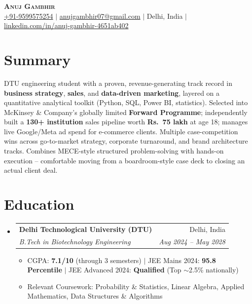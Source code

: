 \documentclass[letterpaper,10.5pt]{article}
\makeatletter
\newcommand{\resumeItem}[1]{
  \item\small{#1 \vspace{-2pt}}
}
\newcommand{\resumeSubheading}[4]{
  \vspace{-2pt}\item
    \begin{tabular*}{0.97\textwidth}[t]{l@{\extracolsep{\fill}}r}
      \textbf{#1} & \small #2 \\
      \textit{\small#3} & \textit{\small #4} \\
    \end{tabular*}\vspace{-5pt}
}
\newcommand{\resumeSubHeadingListStart}{\begin{itemize}[leftmargin=0.12in, label={}]}
\newcommand{\resumeSubHeadingListEnd}{\end{itemize}}
\newcommand{\resumeItemListStart}{\begin{itemize}[leftmargin=0.18in]}
\newcommand{\resumeItemListEnd}{\end{itemize}\vspace{-4pt}}
\makeatother
\begin{document}
\begin{center}
    {\LARGE \scshape \textbf{Anuj Gambhir}} \\ \vspace{3pt}
    \small
    \href{tel:9599575254}{+91-9599575254} $|$
    \href{mailto:anujgambhir07@gmail.com}{anujgambhir07@gmail.com} $|$
    Delhi, India $|$
    \href{https://www.linkedin.com/in/anuj-gambhir-4651ab402/}{linkedin.com/in/anuj-gambhir-4651ab402}
\end{center}
\vspace{-12pt}

\section{Summary}
\small{DTU engineering student with a proven, revenue-generating track record in \textbf{business strategy}, \textbf{sales}, and \textbf{data-driven marketing}, layered on a quantitative analytical toolkit (Python, SQL, Power BI, statistics). Selected into McKinsey \& Company's globally limited \textbf{Forward Programme}; independently built a \textbf{130+ institution} sales pipeline worth \textbf{Rs.\ 75 lakh} at age 18; manages live Google/Meta ad spend for e-commerce clients. Multiple case-competition wins across go-to-market strategy, corporate turnaround, and brand architecture tracks. Combines MECE-style structured problem-solving with hands-on execution -- comfortable moving from a boardroom-style case deck to closing an actual client deal.}
\vspace{-4pt}

\section{Education}
\resumeSubHeadingListStart
  \resumeSubheading
    {Delhi Technological University (DTU)}{Delhi, India}
    {B.Tech in Biotechnology Engineering}{Aug 2024 -- May 2028}
    \resumeItemListStart
      \resumeItem{CGPA: \textbf{7.1/10} (through 3 semesters) $|$ JEE Mains 2024: \textbf{95.8 Percentile} $|$ JEE Advanced 2024: \textbf{Qualified} (Top $\sim$2.5\% nationally)}
      \resumeItem{Relevant Coursework: Probability \& Statistics, Linear Algebra, Applied Mathematics, Data Structures \& Algorithms}
    \resumeItemListEnd
\resumeSubHeadingListEnd
\vspace{-6pt}

\end{document}
